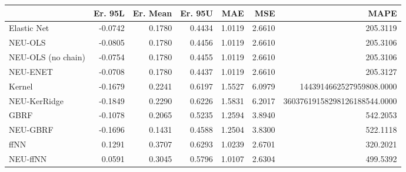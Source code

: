 \begin{tabular}{lrrrrrr}
\toprule
{} &  Er. 95L &  Er. Mean &  Er. 95U &    MAE &    MSE &                         MAPE \\
\midrule
Elastic Net        &  -0.0742 &    0.1780 &   0.4434 & 1.0119 & 2.6610 &                     205.3119 \\
NEU-OLS            &  -0.0805 &    0.1780 &   0.4456 & 1.0119 & 2.6610 &                     205.3106 \\
NEU-OLS (no chain) &  -0.0754 &    0.1780 &   0.4455 & 1.0119 & 2.6610 &                     205.3106 \\
NEU-ENET           &  -0.0708 &    0.1780 &   0.4437 & 1.0119 & 2.6610 &                     205.3127 \\
Kernel             &  -0.1679 &    0.2241 &   0.6197 & 1.5527 & 6.0979 &     1443914662527959808.0000 \\
NEU-KerRidge       &  -0.1849 &    0.2290 &   0.6226 & 1.5831 & 6.2017 & 36037619158298126188544.0000 \\
GBRF               &  -0.1078 &    0.2065 &   0.5235 & 1.2594 & 3.8940 &                     542.2053 \\
NEU-GBRF           &  -0.1696 &    0.1431 &   0.4588 & 1.2504 & 3.8300 &                     522.1118 \\
ffNN               &   0.1291 &    0.3707 &   0.6293 & 1.0239 & 2.6701 &                     320.2021 \\
NEU-ffNN           &   0.0591 &    0.3045 &   0.5796 & 1.0107 & 2.6304 &                     499.5392 \\
\bottomrule
\end{tabular}
